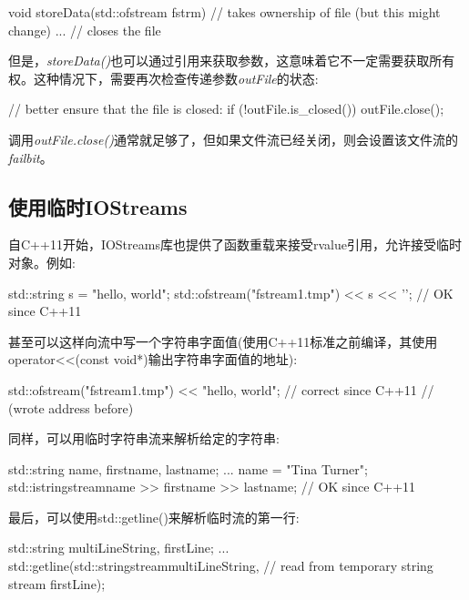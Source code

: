 \begin{cppcode}
void storeData(std::ofstream fstrm) // takes ownership of file (but this might change)
{
	...
} // closes the file
\end{cppcode}

但是，\textit{storeData()}也可以通过引用来获取参数，这意味着它不一定需要获取所有权。这种情况下，需要再次检查传递参数\textit{outFile}的状态:

\begin{cppcode}
// better ensure that the file is closed:
if (!outFile.is_closed()) {
	outFile.close();
}
\end{cppcode}

调用\textit{outFile.close()}通常就足够了，但如果文件流已经关闭，则会设置该文件流的\textit{failbit}。

\subsection{使用临时IOStreams}

自C++11开始，IOStreams库也提供了函数重载来接受rvalue引用，允许接受临时对象。例如:

\begin{cppcode}
std::string s = "hello, world";
std::ofstream("fstream1.tmp") << s << '\n'; // OK since C++11
\end{cppcode}

甚至可以这样向流中写一个字符串字面值(使用C++11标准之前编译，其使用operator<<(const void*)输出字符串字面值的地址):

\begin{cppcode}
std::ofstream("fstream1.tmp") << "hello, world\n"; // correct since C++11
// (wrote address before)
\end{cppcode}

同样，可以用临时字符串流来解析给定的字符串:

\begin{cppcode}
std::string name, firstname, lastname;
...
name = "Tina Turner";
std::istringstream{name} >> firstname >> lastname; // OK since C++11
\end{cppcode}

最后，可以使用std::getline()来解析临时流的第一行:

\begin{cppcode}
std::string multiLineString, firstLine;
...
std::getline(std::stringstream{multiLineString}, // read from temporary string stream
firstLine);
\end{cppcode}



























